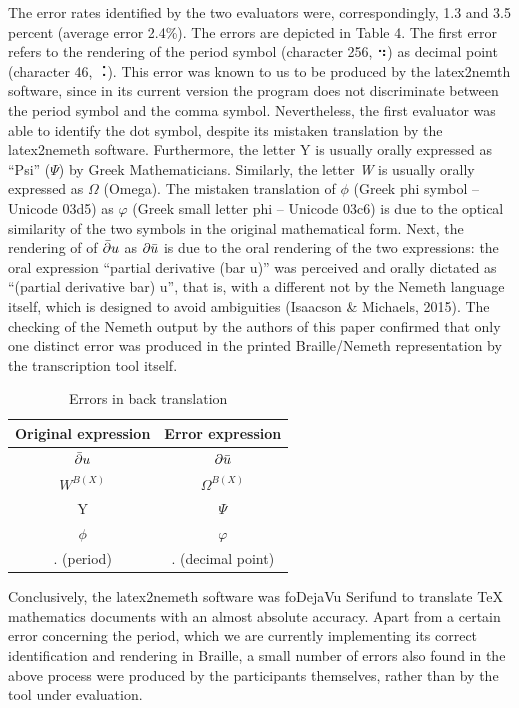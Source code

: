 \documentclass[11.5pt]{sig-alternate} %
\begin{document}
\begin{large}
The error rates identified by the two evaluators were, correspondingly, 1.3 and 3.5 percent (average error 2.4\%). The errors are depicted in Table 4. The first error refers to the rendering of the period symbol (character 256, ⠲) as decimal point (character 46, ⠨). This error was known to us to be produced by the latex2nemth software, since in its current version the program does not discriminate between the period symbol and the comma symbol. Nevertheless, the first evaluator was able to identify the dot symbol, despite its mistaken translation by the latex2nemeth software. Furthermore, the letter Y is usually orally expressed as “Psi” ($\Psi$) by Greek Mathematicians. Similarly, the letter \textit{W} is usually orally expressed as $\Omega$ (Omega). The mistaken translation of $\phi$ (Greek phi symbol – Unicode 03d5) as $\varphi$ (Greek small letter phi – Unicode 03c6) is due to the optical similarity of the two symbols in the original mathematical form. Next, the rendering of of $\Bar{\partial}u$ as $\partial \Bar{u}$  is due to the oral rendering of the two expressions: the oral expression “partial derivative (bar u)” was perceived and orally dictated as “(partial derivative bar) u”, that is, with a different not by the Nemeth language itself, which is designed to avoid ambiguities (Isaacson \& Michaels, 2015). The checking of the Nemeth output by the authors of this paper confirmed that only one distinct error was produced in the printed Braille/Nemeth representation by the transcription tool itself.

\begin{table}[htb]
\caption{Errors in back translation}
\begin{tabular}{cc}
\hline
\textbf{Original expression} & \textbf{Error expression} \\ \hline
$\Bar{\partial}u$ & $\partial \Bar{u}$ \\ \hline
$W^{B(X)}$ & $\Omega^{B(X)}$ \\ \hline
Y & $\Psi$ \\ \hline
$\phi$ & $\varphi$ \\ \hline
. (period) & . (decimal point) \\ \hline
\end{tabular}
\end{table}

Conclusively, the latex2nemeth software was foDejaVu Serifund to translate TeX mathematics documents with an almost absolute accuracy. Apart from a certain error concerning the period, which we are currently implementing its correct identification and rendering in Braille, a small number of errors also found in the above process were produced by the participants themselves, rather than by the tool under evaluation. 


\end{large}
\end{document}
